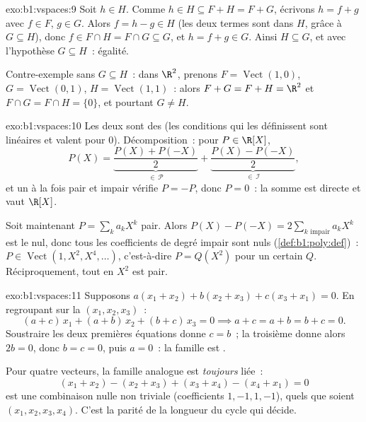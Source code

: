 \begin{solution}{exo:b1:vspaces:9}
Soit $h \in H$. Comme $h \in H \subseteq F + H = F + G$, écrivons $h = f
+ g$ avec $f \in F$, $g \in G$. Alors $f = h - g \in H$ (les deux
termes sont dans $H$, grâce à $G \subseteq H$), donc $f \in F \cap H =
F \cap G \subseteq G$, et $h = f + g \in G$. Ainsi $H \subseteq G$, et
avec l'hypothèse $G \subseteq H$~: égalité.

Contre-exemple sans $G \subseteq H$~: dans $\R^2$, prenons $F =
\operatorname{Vect}(1,0)$, $G = \operatorname{Vect}(0,1)$, $H =
\operatorname{Vect}(1,1)$~: alors $F + G = F + H = \R^2$ et $F \cap G
= F \cap H = \{0\}$, et pourtant $G \neq H$.
\end{solution}

\begin{solution}{exo:b1:vspaces:10}
Les deux  sont des  (les conditions qui les
définissent sont linéaires et valent pour $0$). Décomposition~: pour
$P \in \R[X]$,
\[
P(X) = \underbrace{\frac{P(X) + P(-X)}{2}}_{\in\,\mathcal P}
+ \underbrace{\frac{P(X) - P(-X)}{2}}_{\in\,\mathcal I},
\]
et un  à la fois pair et impair vérifie $P = -P$, donc $P = 0$~:
la somme est directe et vaut $\R[X]$.

Soit maintenant $P = \sum_k a_k X^k$ pair. Alors $P(X) - P(-X) = 2
\sum_{k \text{ impair}} a_k X^k$ est le  nul, donc tous les
coefficients de degré impair sont nuls (\cref{def:b1:poly:def})~: $P \in
\operatorname{Vect}(1, X^2, X^4, \dots)$, c'est-à-dire $P = Q(X^2)$ pour
un certain  $Q$. Réciproquement, tout  en $X^2$ est
pair.
\end{solution}

\begin{solution}{exo:b1:vspaces:11}
Supposons $a(x_1 + x_2) + b(x_2 + x_3) + c(x_3 + x_1) = 0$.
En regroupant sur la  $(x_1, x_2, x_3)$~:
\[
(a + c)\,x_1 + (a + b)\,x_2 + (b + c)\,x_3 = 0
\implies a + c = a + b = b + c = 0 .
\]
Soustraire les deux premières équations donne $c = b$~; la troisième
donne alors $2b = 0$, donc $b = c = 0$, puis $a = 0$~: la famille est
.

Pour quatre vecteurs, la famille analogue est \emph{toujours} liée~:
\[
(x_1 + x_2) - (x_2 + x_3) + (x_3 + x_4) - (x_4 + x_1) = 0
\]
est une combinaison nulle non triviale (coefficients $1, -1, 1, -1$),
quels que soient $(x_1, x_2, x_3, x_4)$. C'est la parité de la longueur
du cycle qui décide.
\end{solution}


